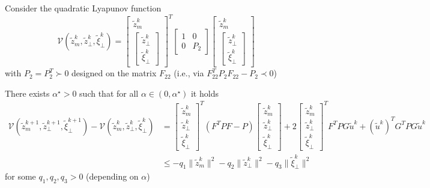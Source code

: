 \documentclass{book}
\theoremstyle{theoremv2}
\theoremstyle{defv2}
\theoremstyle{remark}
\theoremstyle{remark}
\theoremstyle{definition}
\theoremstyle{definition}
\begin{document}
Consider the quadratic Lyapunov function
\[
    \mathcal{V}(\tilde{z}^k_m,\tilde{z}^k_\perp,\tilde{\xi}^k_\perp) = \begin{bmatrix}
         \tilde{z}^{k}_m \\ \begin{bmatrix}
             \tilde{z}^{k}_\perp \\ \tilde{\xi}^{k}_\perp 
         \end{bmatrix}
    \end{bmatrix}^T \begin{bmatrix}
        1 & 0 \\ 0 & P_2
    \end{bmatrix} \begin{bmatrix}
         \tilde{z}^{k}_m \\ \begin{bmatrix}
             \tilde{z}^{k}_\perp \\ \tilde{\xi}^{k}_\perp 
         \end{bmatrix}
    \end{bmatrix}
\]
with $P_2 = P_2^T \succ 0$ designed on the matrix $F_{22}$ (i.e., via $F_{22}^TP_2F_{22}-P_2 \prec 0$)

There exists $\alpha^\star >0$ such that for all $\alpha\in(0,\alpha^\star)$ it holds
\begin{align*}
    \mathcal{V}(\tilde{z}^{k+1}_m,\tilde{z}^{k+1}_\perp,\tilde{\xi}^{k+1}_\perp) - \mathcal{V}(\tilde{z}^k_m,\tilde{z}^k_\perp,\tilde{\xi}^k_\perp) &= \begin{bmatrix}
        \tilde{z}^{k}_m \\ \tilde{z}^{k}_\perp \\ \tilde{\xi}^{k}_\perp 
    \end{bmatrix}^T (F^TPF-P) \begin{bmatrix}
        \tilde{z}^{k}_m \\ \tilde{z}^{k}_\perp \\ \tilde{\xi}^{k}_\perp 
    \end{bmatrix} + 2 \begin{bmatrix}
        \tilde{z}^{k}_m \\ \tilde{z}^{k}_\perp \\ \tilde{\xi}^{k}_\perp 
    \end{bmatrix}^T F^TPG\tilde{u}^k + (\tilde{u}^k)^T G^T PG\tilde{u}^k \\
    &\leq -q_1\|\tilde{z}_m^k\|^2 - q_2 \|\tilde{z}^k_\perp\|^2 -q_3 \|\tilde{\xi}^k_\perp\|^2
\end{align*}
for some $q_1,q_2,q_3>0$ (depending on $\alpha$)
\end{document}
